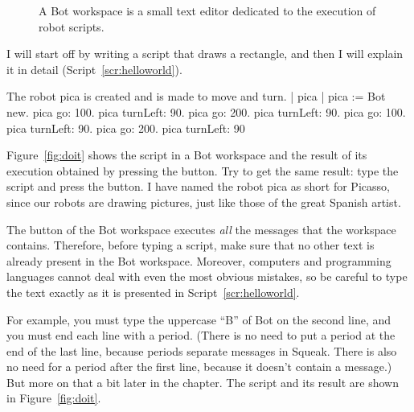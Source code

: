 \documentclass[a4paper,10pt,twoside]{book}
\begin{document}
\begin{figure}[!h]
\caption{A Bot workspace is a small text editor dedicated to the execution of robot scripts. 
  \label{fig:TurtleWorkspace}}
\end{figure}

I will start off by writing a script that draws a rectangle, and then I will explain it in detail (Script~\ref{scr:helloworld}). 


\begin{script}[helloworld]{The robot pica is created and is made to move and turn.}
	| pica | 
	pica := Bot new. 
	pica go: 100. 
	pica turnLeft: 90. 
	pica go: 200. 
	pica turnLeft: 90. 
	pica go: 100. 
	pica turnLeft: 90. 
	pica go: 200. 
	pica turnLeft: 90
\end{script}


Figure~\ref{fig:doit} shows the script in a Bot workspace and the result of its execution obtained by pressing the  button. Try to get the same result: type the script and press the  button. I have named the robot pica as short for Picasso, since our robots are drawing pictures, just like those of the great Spanish artist. 

The  button of the Bot workspace executes \emph{all} the messages that the workspace contains. Therefore, before typing a script, make sure that no other text is already present in the Bot workspace. Moreover, computers and programming languages cannot deal with even the most obvious mistakes, so be careful to type the text exactly as it is presented in Script~\ref{scr:helloworld}. 

For example, you must type the uppercase “B” of Bot on the second line, and you must end 
each line with a period. (There is no need to put a period at the end of the last line, because periods separate messages in Squeak. There is also no need for a period after the first line,  because it doesn’t contain a message.) But more on that a bit later in the chapter. The script and its result are shown in Figure~\ref{fig:doit}.
\end{document}
